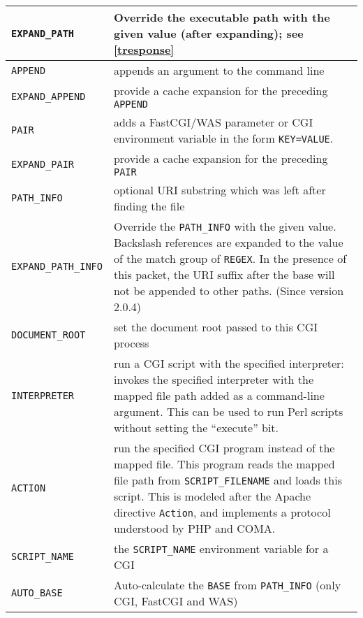 \documentclass[a4paper,12pt]{article}
\begin{document}
\begin{longtable}{|l|p{8cm}|}
\hline

\verb|EXPAND_PATH| & Override the executable path with the given value
(after expanding); see \ref{tresponse} \\

\hline

\verb|APPEND| & appends an argument to the command line \\

\hline

\verb|EXPAND_APPEND| & provide a cache expansion for the preceding
\verb|APPEND| \\

\hline

\verb|PAIR| & adds a FastCGI/WAS parameter or CGI environment
variable in the form \texttt{KEY=VALUE}. \\

\hline

\verb|EXPAND_PAIR| & provide a cache expansion for the preceding
\verb|PAIR| \\

\hline

\verb|PATH_INFO| & optional URI substring which was left after
finding the file \\

\hline

\verb|EXPAND_PATH_INFO| & Override the \verb|PATH_INFO| with the given
value.  Backslash references are expanded to the value of the match
group of \verb|REGEX|. In the presence of this packet, the URI suffix
after the base will not be appended to other paths.
\scriptsize{(Since version 2.0.4)} \\

\hline

\verb|DOCUMENT_ROOT| & set the document root passed to this CGI
process \\

\hline

\verb|INTERPRETER| & run a CGI script with the specified
interpreter: invokes the specified interpreter with the mapped file
path added as a command-line argument.  This can be used to run Perl
scripts without setting the  ``execute'' bit. \\

\hline

\verb|ACTION| & run the specified CGI program instead of the mapped
file.  This program reads the mapped file path from
\verb|SCRIPT_FILENAME| and loads this script.  This is modeled after
the Apache directive \verb|Action|, and implements a protocol
understood by PHP and COMA. \\

\hline

\verb|SCRIPT_NAME| & the \verb|SCRIPT_NAME| environment variable
for a CGI \\

\hline

\verb|AUTO_BASE| & Auto-calculate the \verb|BASE| from
\verb|PATH_INFO| (only CGI, FastCGI and WAS) \\

\hline
\end{longtable}
\end{document}
